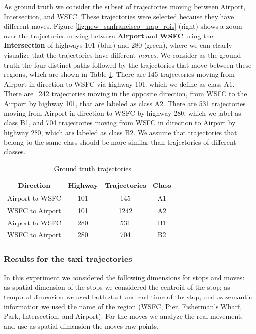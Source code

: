 As ground truth we consider the subset of trajectories moving between Airport,  Intersection, and WSFC. These trajectories were selected because they have different moves.  Figure {\ref{fig:new_sanfrancisco_map_rois}} (right) shows a zoom over the trajectories moving between  \textbf{Airport} and \textbf{WSFC}  using the \textbf{Intersection} of highways 101 (blue) and 280 (green), where we can clearly visualize that the trajectories have different \emph{moves}. We consider as the ground truth the four distinct paths followed by the trajectories that move between these regions, which are shown in Table {\ref{tab:new_san_francisco_dataset}}. There are 145 trajectories moving from Airport in direction to WSFC via highway 101, which we define as class A1. There are 1242 trajectories moving in the opposite direction, from WSFC to the Airport by highway 101, that are labeled as class A2. There are 531 trajectories moving from Airport in direction to WSFC by highway 280, which we label as class B1, and 704 trajectories moving from WSFC in direction to Airport by highway 280, which are labeled as class B2. We assume that trajectories that belong to the same class should be more similar than trajectories of different classes.

\begin{table}[h]
\scriptsize
  \centering
  \begin{tabular}{|c|c|c|c|c|}
  \hline
 Direction & Highway & Trajectories & Class \\
  \hline
 Airport to WSFC & 101 & 145 & A1\\
 WSFC to Airport & 101 & 1242 & A2\\
 Airport to WSFC & 280 & 531 & B1\\
 WSFC to Airport & 280 & 704 & B2\\
    \hline
  \end{tabular}
  \caption{Ground truth trajectories}
  \label{tab:new_san_francisco_dataset}
\end{table}

\subsubsection{Results for the taxi trajectories}

{In this experiment we considered the following dimensions for stops and moves: as spatial dimension of the stops we considered the centroid of the stop; as temporal dimension we used both start and end time of the stop; and as semantic information we used the name of the region (WSFC, Pier, Fisherman's Wharf, Park, Intersection, and Airport). For the moves we analyze the real movement, and use as spatial dimension the moves raw points.}

